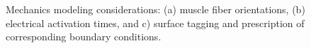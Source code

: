 \begin{figure}[ht]
{\label{fig:supp2}}
%
\caption{Mechanics modeling considerations: (a) muscle fiber orientations, (b) electrical activation times, and c) surface tagging and prescription of corresponding boundary conditions.}
\label{fig:supp}
\end{figure}

